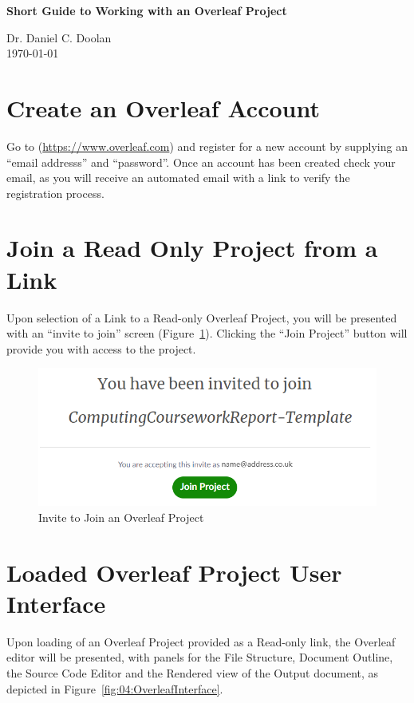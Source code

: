 \documentclass[12pt]{article}
\begin{document}
\begin{center}
    \vspace{0.8cm}
    \Large
    \textbf{Short Guide to Working with an Overleaf Project}
    
    \vspace{0.5cm}
    
    Dr. Daniel C. Doolan\\
    \large
    \today
\end{center}
\singlespacing
\tableofcontents  %
\listoffigures    %
\clearpage
\onehalfspacing

\section{Create an Overleaf Account}
Go to (\url{https://www.overleaf.com}) and register for a new account by supplying an ``email addresss'' and ``password''. Once an account has been created check your email, as you will receive an automated email with a link to verify the registration process.

\section{Join a Read Only Project from a Link}
Upon selection of a Link to a Read-only Overleaf Project, you will be presented with an ``invite to join'' screen (Figure~\ref{fig:00:OverleafInviteToJoin}). Clicking the ``Join Project'' button will provide you with access to the project. 

\begin{figure}[H]
\begin{center}
\includegraphics[width=.70\linewidth]{00-InviteToJoinProject.png}
\caption{Invite to Join an Overleaf Project} \label{fig:00:OverleafInviteToJoin}
\end{center}
\end{figure}

\section{Loaded Overleaf Project User Interface}
Upon loading of an Overleaf Project provided as a Read-only link, the Overleaf editor will be presented, with panels for the File Structure, Document Outline, the Source Code Editor and the Rendered view of the Output document, as depicted in Figure~\ref{fig:04:OverleafInterface}.
\end{document}
